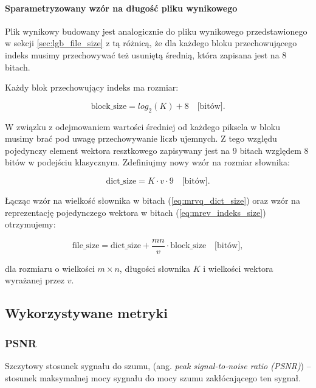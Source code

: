 \documentclass{article}
\begin{document}
\paragraph{Sparametryzowany wzór na długość pliku wynikowego}

Plik wynikowy budowany jest analogicznie do pliku wynikowego przedstawionego w sekcji \ref{sec:lgb_file_size} z tą różnicą, że dla każdego bloku przechowującego indeks musimy przechowywać też usuniętą średnią, która zapisana jest na $8$ bitach.

Każdy blok przechowujący indeks ma rozmiar:

\begin{equation}
	\textrm{block\_size} = log_2(K) + 8 \quad  \textrm{[bitów]}.
	\label{eq:mrev_indeks_size}
\end{equation}

W związku z odejmowaniem wartości średniej od każdego piksela w bloku musimy brać pod uwagę przechowywanie liczb ujemnych. Z tego względu pojedynczy element wektora resztkowego zapisywany jest na 9 bitach względem 8 bitów w podejściu klasycznym. Zdefiniujmy nowy wzór na rozmiar słownika:

\begin{equation}
	\textrm{dict\_size} = K \cdot v \cdot 9 \quad \textrm{[bitów]}.
	\label{eq:mrvq_dict_size}
\end{equation}

Łącząc wzór na wielkość słownika w bitach (\ref{eq:mrvq_dict_size}) oraz wzór na reprezentację pojedynczego wektora w bitach (\ref{eq:mrev_indeks_size}) otrzymujemy:

\begin{equation}
	\textrm{file\_size} = \textrm{dict\_size} + \frac{mn}{v} \cdot \textrm{block\_size}  \quad  \textrm{[bitów]},
	\label{eq:mrvq_image_size}
\end{equation}

dla rozmiaru o wielkości $m \times n$, długości słownika $K$ i wielkości wektora wyrażanej przez $v$.

\subsection{Wykorzystywane metryki}

\subsubsection{PSNR}

Szczytowy stosunek sygnału do szumu, (ang. \emph{peak signal-to-noise ratio (PSNR)}) – stosunek maksymalnej mocy sygnału do mocy szumu zakłócającego ten sygnał.  
\end{document}
